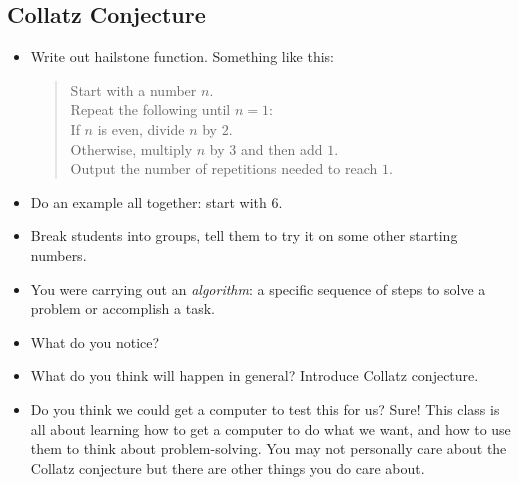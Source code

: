 \documentclass{article}
\newcommand{\eg}{\emph{e.g.}\xspace}
\begin{document}


\subsection*{Collatz Conjecture}

\begin{itemize}
\item Write out hailstone function. Something like this:
  \begin{quote}
    Start with a number $n$. \\
    Repeat the following until $n = 1$: \\
    \mbox{} \quad If $n$ is even, divide $n$ by $2$. \\
    \mbox{} \quad Otherwise, multiply $n$ by $3$ and then add $1$. \\
    Output the number of repetitions needed to reach $1$.
  \end{quote}
\item Do an example all together: start with 6.
\item Break students into groups, tell them to try it on some other
  starting numbers.
\item You were carrying out an \emph{algorithm}: a specific sequence
  of steps to solve a problem or accomplish a task.
\item What do you notice?
\item What do you think will happen in general?  Introduce Collatz
  conjecture.
\item Do you think we could get a computer to test this for us?  Sure!
  This class is all about learning how to get a computer to do what we
  want, and how to use them to think about problem-solving.  You may
  not personally care about the Collatz conjecture but there are other
  things you do care about.
\end{itemize}
\end{document}
